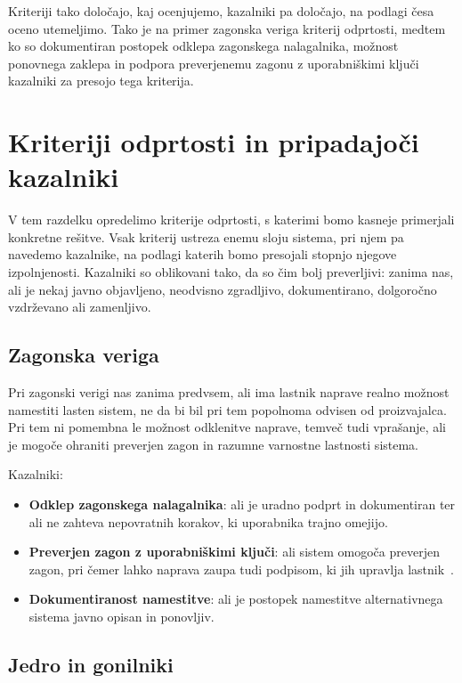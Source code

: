 \documentclass[a4paper,12pt,openright]{book}
\begin{document}
Kriteriji tako določajo, kaj ocenjujemo, kazalniki pa določajo, na podlagi česa oceno utemeljimo.
Tako je na primer zagonska veriga kriterij odprtosti, medtem ko so dokumentiran postopek odklepa zagonskega nalagalnika, možnost ponovnega zaklepa in podpora preverjenemu zagonu z uporabniškimi ključi kazalniki za presojo tega kriterija.

\section{Kriteriji odprtosti in pripadajoči kazalniki}
\label{sec:model_kriteriji_odprtosti}

V tem razdelku opredelimo kriterije odprtosti, s katerimi bomo kasneje primerjali konkretne rešitve.
Vsak kriterij ustreza enemu sloju sistema, pri njem pa navedemo kazalnike, na podlagi katerih bomo presojali stopnjo njegove izpolnjenosti.
Kazalniki so oblikovani tako, da so čim bolj preverljivi: zanima nas, ali je nekaj javno objavljeno, neodvisno zgradljivo, dokumentirano, dolgoročno vzdrževano ali zamenljivo.

\subsection{Zagonska veriga}
\label{subsec:model_boot}

Pri zagonski verigi nas zanima predvsem, ali ima lastnik naprave realno možnost namestiti lasten sistem, ne da bi bil pri tem popolnoma odvisen od proizvajalca.
Pri tem ni pomembna le možnost odklenitve naprave, temveč tudi vprašanje, ali je mogoče ohraniti preverjen zagon in razumne varnostne lastnosti sistema.

Kazalniki:
\begin{itemize}
  \item \textbf{Odklep zagonskega nalagalnika}: ali je uradno podprt in dokumentiran ter ali ne zahteva nepovratnih korakov, ki uporabnika trajno omejijo.
  \item \textbf{Preverjen zagon z uporabniškimi ključi}: ali sistem omogoča preverjen zagon, pri čemer lahko naprava zaupa tudi podpisom, ki jih upravlja lastnik~\cite{android_verified_boot}.
  \item \textbf{Dokumentiranost namestitve}: ali je postopek namestitve alternativnega sistema javno opisan in ponovljiv.
\end{itemize}

\subsection{Jedro in gonilniki}
\label{subsec:model_kernel}
\end{document}
